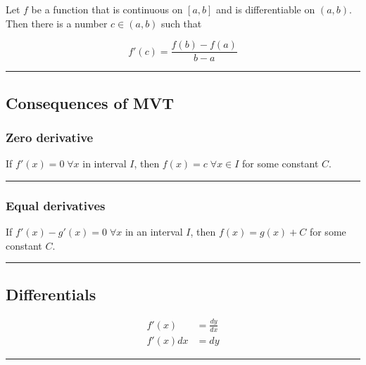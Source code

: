 \documentclass[
  landscape,  
  10pt,
]{article}
\begin{document}
\begin{multicols}{3}
Let \(f\) be a function that is continuous on \([a,b]\) and is
differentiable on \((a,b)\). Then there is a number \(c\in(a,b)\) such
that

\[ f'(c)=\frac{f(b)-f(a)}{b-a} \]

\begin{center}\rule{0.5\linewidth}{0.5pt}\end{center}

\hypertarget{consequences-of-mvt}{%
\subsection{Consequences of MVT}\label{consequences-of-mvt}}

\hypertarget{zero-derivative}{%
\subsubsection{Zero derivative}\label{zero-derivative}}

If \(f'(x)=0 \;\forall x\) in interval \(I\), then
\(f(x)=c \;\forall x\in I\) for some constant \(C\).

\begin{center}\rule{0.5\linewidth}{0.5pt}\end{center}

\hypertarget{equal-derivatives}{%
\subsubsection{Equal derivatives}\label{equal-derivatives}}

If \(f'(x)-g'(x)=0 \;\forall x\) in an interval \(I\), then
\(f(x)=g(x)+C\) for some constant \(C\).

\begin{center}\rule{0.5\linewidth}{0.5pt}\end{center}

\hypertarget{differentials}{%
\subsection{Differentials}\label{differentials}}

\begin{align*}
f'(x)   &= \frac{dy}{dx}\\
f'(x)dx &= dy
\end{align*}

\begin{center}\rule{0.5\linewidth}{0.5pt}\end{center}


\end{multicols}
\end{document}
